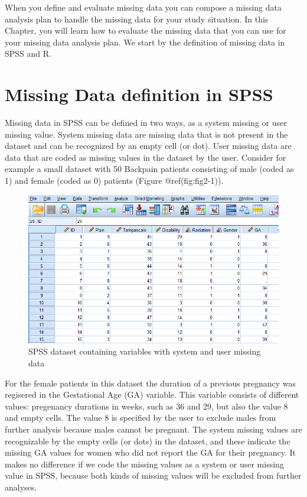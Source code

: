 \documentclass[
]{book}
\begin{document}
When you define and evaluate missing data you can compose a missing data
analysis plan to handle the missing data for your study situation. In
this Chapter, you will learn how to evaluate the missing data that you
can use for your missing data analysis plan. We start by the definition
of missing data in SPSS and R.

\hypertarget{missing-data-definition-in-spss}{%
\section{Missing Data definition in
SPSS}\label{missing-data-definition-in-spss}}

Missing data in SPSS can be defined in two ways, as a system missing or
user missing value. System missing data are missing data that is not
present in the dataset and can be recognized by an empty cell (or dot).
User missing data are data that are coded as missing values in the
dataset by the user. Consider for example a small dataset with 50
Backpain patients consisting of male (coded as 1) and female (coded as
0) patients (Figure @ref(fig:fig2-1)).

\begin{figure}

{\centering \includegraphics[width=0.9\linewidth]{images/fig2.1} 

}

\caption{SPSS dataset containing variables with system and user missing data}\label{fig:fig2-1}
\end{figure}

For the female patients in this dataset the duration of a previous
pregnancy was regisered in the Gestational Age (GA) variable. This
variable consists of different values: pregenancy durations in weeks,
such as 36 and 29, but also the value 8 and empty cells. The value 8 is
specified by the user to exclude males from further analysis because
males cannot be pregnant. The system missing values are recognizable by
the empty cells (or dots) in the dataset, and these indicate the missing
GA values for women who did not report the GA for their pregnancy. It
makes no difference if we code the missing values as a system or user
missing value in SPSS, because both kinds of missing values will be
excluded from further analyses.
\end{document}
